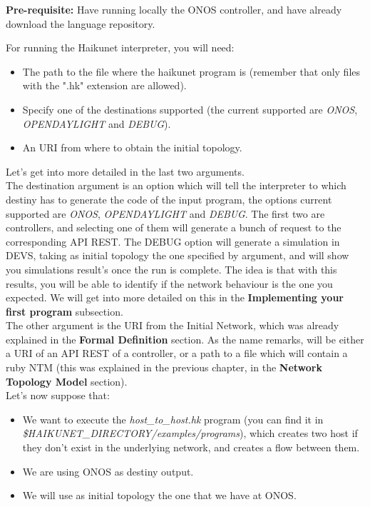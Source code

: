 \textbf{Pre-requisite:} Have running locally the ONOS controller, and have already download the language repository.

For running the Haikunet interpreter, you will need: 
\begin{itemize}
\item The path to the file where the haikunet program is (remember that only files with the ".hk" extension are allowed).
\item Specify one of the destinations supported (the current supported are \textit{ONOS}, \textit{OPENDAYLIGHT} and \textit{DEBUG}).
\item An URI from where to obtain the initial topology.
\end{itemize}

Let's get into more detailed in the last two arguments.\\
The destination argument is an option which will tell the interpreter to which destiny has to generate the code of the input program, the options current supported are \textit{ONOS}, \textit{OPENDAYLIGHT} and \textit{DEBUG}. The first two are controllers, and selecting one of them will generate a bunch of request to the corresponding API REST. The DEBUG option will generate a simulation in DEVS, taking as initial topology the one specified by argument, and will show you simulations result's once the run is complete. The idea is that with this results, you will be able to identify if the network behaviour is the one you expected. We will get into more detailed on this in the \textbf{Implementing your first program} subsection.\\
The other argument is the URI from the Initial Network, which was already explained in the \textbf{Formal Definition} section. As the name remarks, will be either a URI of an API REST of a controller, or a path to a file which will contain a ruby NTM (this was explained in the previous chapter, in the \textbf{Network Topology Model} section).\\

Let's now suppose that:
\begin{itemize}
\item We want to execute the \textit{host\_to\_host.hk} program (you can find it in \textit{\$HAIKUNET\_DIRECTORY/examples/programs}), which creates two host if they don't exist in the underlying network, and creates a flow between them. 
\item We are using ONOS as destiny output.
\item We will use as initial topology the one that we have at ONOS. 
\end{itemize} 

